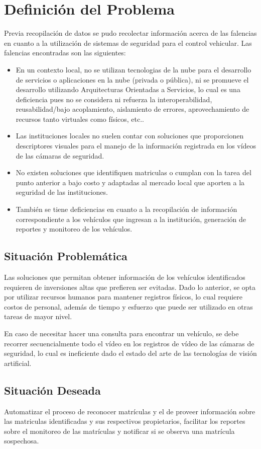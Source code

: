\section{Definición del Problema}
Previa recopilación de datos se pudo recolectar información acerca de las falencias en cuanto a la utilización de sistemas de seguridad para el control vehicular. Las falencias encontradas son las siguientes:
\begin{itemize}
  \item En un contexto local, no se utilizan tecnologias de la nube para el desarrollo de servicios o aplicaciones en la nube (privada o pública), ni se promueve el desarrollo utilizando Arquitecturas Orientadas a Servicios, lo cual es una deficiencia pues no se considera ni refuerza la interoperabilidad, reusabilidad/bajo acoplamiento, aislamiento de errores, aprovechamiento de recursos tanto virtuales como físicos, etc.. 
  \item Las instituciones locales no suelen contar con soluciones que proporcionen descriptores visuales para el manejo de la información registrada en los vídeos de las cámaras de seguridad. 
  \item No existen soluciones que identifiquen matriculas o cumplan con la tarea del punto anterior a bajo costo y adaptadas al mercado local que aporten a la seguridad de las instituciones.
  \item También se tiene deficiencias en cuanto a la recopilación de información correspondiente a los vehículos que ingresan a la institución, generación de reportes y monitoreo de los vehículos.
\end{itemize}

    \subsection{Situación Problemática}
    Las soluciones que permitan obtener información de los vehículos identificados requieren de inversiones altas que prefieren ser evitadas. Dado lo anterior, se opta por utilizar recursos humanos para mantener registros físicos, lo cual requiere costos de personal, además de tiempo y esfuerzo que puede ser utilizado en otras tareas de mayor nivel.
    
    En caso de necesitar hacer una consulta para encontrar un vehículo, se debe recorrer secuencialmente todo el vídeo en los registros de vídeo de las cámaras de seguridad, lo cual es ineficiente dado el estado del arte de las tecnologías de visión artificial.
    \subsection{Situación Deseada}
    Automatizar el proceso de reconocer matrículas y el de proveer información sobre las matriculas identificadas y sus respectivos propietarios, facilitar los reportes sobre el monitoreo de las matrículas y notificar si se observa una matrícula sospechosa.
